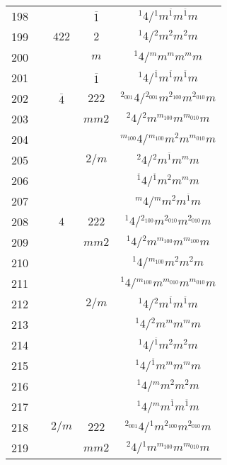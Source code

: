 \begin{longtable}{ccccc}
  198 &  &  & $\overline{1}$ & ${}^{1} 4  / {}^{1} m {}^{\overline{1}} m {}^{\overline{1}} m $\\
  199 &  & $422$ & $2$ & ${}^{1} 4  / {}^{2} m {}^{2} m {}^{2} m $\\
  200 &  &  & $m$ & ${}^{1} 4  / {}^{m} m {}^{m} m {}^{m} m $\\
  201 &  &  & $\overline{1}$ & ${}^{1} 4  / {}^{\overline{1}} m {}^{\overline{1}} m {}^{\overline{1}} m $\\
  202 &  & $\overline{4}$ & $222$ & ${}^{2_{001}} 4  / {}^{2_{001}} m {}^{2_{100}} m {}^{2_{010}} m $\\
  203 &  &  & $mm2$ & ${}^{2} 4  / {}^{2} m {}^{m_{100}} m {}^{m_{010}} m $\\
  204 &  &  &  & ${}^{m_{100}} 4  / {}^{m_{100}} m {}^{2} m {}^{m_{010}} m $\\
  205 &  &  & $2/m$ & ${}^{2} 4  / {}^{2} m {}^{\overline{1}} m {}^{m} m $\\
  206 &  &  &  & ${}^{\overline{1}} 4  / {}^{\overline{1}} m {}^{2} m {}^{m} m $\\
  207 &  &  &  & ${}^{m} 4  / {}^{m} m {}^{2} m {}^{\overline{1}} m $\\
  208 &  & $4$ & $222$ & ${}^{1} 4  / {}^{2_{100}} m {}^{2_{010}} m {}^{2_{010}} m $\\
  209 &  &  & $mm2$ & ${}^{1} 4  / {}^{2} m {}^{m_{100}} m {}^{m_{100}} m $\\
  210 &  &  &  & ${}^{1} 4  / {}^{m_{100}} m {}^{2} m {}^{2} m $\\
  211 &  &  &  & ${}^{1} 4  / {}^{m_{100}} m {}^{m_{010}} m {}^{m_{010}} m $\\
  212 &  &  & $2/m$ & ${}^{1} 4  / {}^{2} m {}^{\overline{1}} m {}^{\overline{1}} m $\\
  213 &  &  &  & ${}^{1} 4  / {}^{2} m {}^{m} m {}^{m} m $\\
  214 &  &  &  & ${}^{1} 4  / {}^{\overline{1}} m {}^{2} m {}^{2} m $\\
  215 &  &  &  & ${}^{1} 4  / {}^{\overline{1}} m {}^{m} m {}^{m} m $\\
  216 &  &  &  & ${}^{1} 4  / {}^{m} m {}^{2} m {}^{2} m $\\
  217 &  &  &  & ${}^{1} 4  / {}^{m} m {}^{\overline{1}} m {}^{\overline{1}} m $\\
  218 &  & $2/m$ & $222$ & ${}^{2_{001}} 4  / {}^{1} m {}^{2_{100}} m {}^{2_{010}} m $\\
  219 &  &  & $mm2$ & ${}^{2} 4  / {}^{1} m {}^{m_{100}} m {}^{m_{010}} m $\\

\end{longtable}
